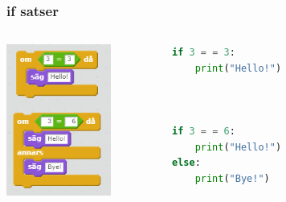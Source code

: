 \documentclass{beamer}
\begin{document}
\begin{frame}[fragile]
	\frametitle{if satser}
	
	\begin{columns}[c] %
		\begin{center}
			\includegraphics[width=0.7\textwidth]{blocks/if_sats.png}
		\end{center}
		\begin{lstlisting}[language=Python]
if 3 = = 3:
	print("Hello!")



if 3 = = 6:
	print("Hello!")
else:
	print("Bye!")
		\end{lstlisting}
	\end{columns}
\end{frame}
\end{document}
